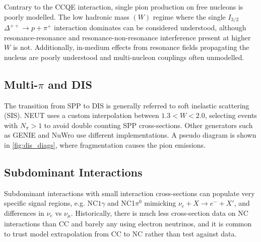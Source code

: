 Contrary to the CCQE interaction, single pion production on free nucleons is poorly modelled. The low hadronic mass $(W)$ regime where the single $I_{3/2}$ $\Delta^{++}\rightarrow p+\pi^+$ interaction dominates can be considered understood, although resonance-resonance and resonance-non-resonance interference present at higher $W$ is not. Additionally, in-medium effects from resonance fields propagating the nucleus are poorly understood and multi-nucleon couplings often unmodelled\cite{nustec,katori_martini}.

\subsection{Multi-$\pi$ and DIS}
The transition from SPP to DIS is generally referred to soft inelastic scattering (SIS). NEUT uses a custom interpolation between $1.3 < W < 2.0$, selecting events with $N_\pi>1$ to avoid double counting SPP cross-sections. Other generators such as GENIE\cite{genie} and NuWro\cite{NuWro} use different implementations. A pseudo diagram is shown in \autoref{fig:dis_diags}, where fragmentation causes the pion emissions.

\subsection{Subdominant Interactions}
Subdominant interactions with small interaction cross-sections can populate very specific signal regions, e.g. NC$1\gamma$ and NC1$\pi^0$ mimicking $\nu_e + X\rightarrow e^- + X'$, and differences in $\nu_e$ vs $\nu_\mu$. Historically, there is much less cross-section data on NC interactions than CC and barely any using electron neutrinos, and it is common to trust model extrapolation from CC to NC rather than test against data. 

